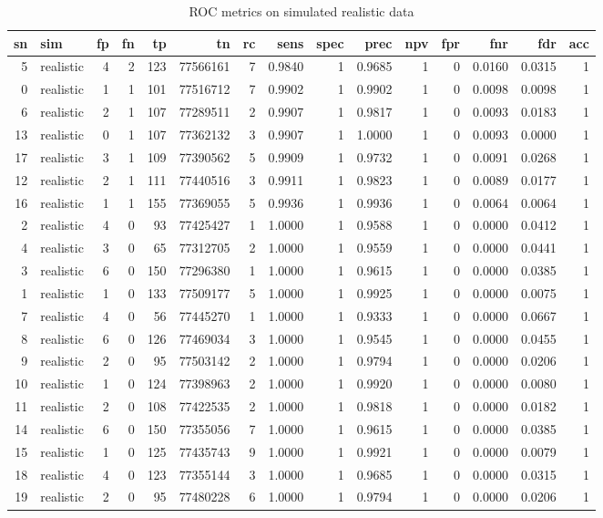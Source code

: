 \begin{sidewaystable}[]
\centering
\caption{ROC metrics on simulated realistic data}
\label{tbl:roc_realistic}
\begin{tabular}{rlrrrrrrrrrrrrr}
\toprule
sn & sim & fp & fn & tp & tn & rc & sens & spec & prec & npv & fpr & fnr & fdr & acc\\
\midrule
5 & realistic & 4 & 2 & 123 & 77566161 & 7 & 0.9840 & 1 & 0.9685 & 1 & 0 & 0.0160 & 0.0315 & 1\\
0 & realistic & 1 & 1 & 101 & 77516712 & 7 & 0.9902 & 1 & 0.9902 & 1 & 0 & 0.0098 & 0.0098 & 1\\
6 & realistic & 2 & 1 & 107 & 77289511 & 2 & 0.9907 & 1 & 0.9817 & 1 & 0 & 0.0093 & 0.0183 & 1\\
13 & realistic & 0 & 1 & 107 & 77362132 & 3 & 0.9907 & 1 & 1.0000 & 1 & 0 & 0.0093 & 0.0000 & 1\\
17 & realistic & 3 & 1 & 109 & 77390562 & 5 & 0.9909 & 1 & 0.9732 & 1 & 0 & 0.0091 & 0.0268 & 1\\
12 & realistic & 2 & 1 & 111 & 77440516 & 3 & 0.9911 & 1 & 0.9823 & 1 & 0 & 0.0089 & 0.0177 & 1\\
16 & realistic & 1 & 1 & 155 & 77369055 & 5 & 0.9936 & 1 & 0.9936 & 1 & 0 & 0.0064 & 0.0064 & 1\\
2 & realistic & 4 & 0 & 93 & 77425427 & 1 & 1.0000 & 1 & 0.9588 & 1 & 0 & 0.0000 & 0.0412 & 1\\
4 & realistic & 3 & 0 & 65 & 77312705 & 2 & 1.0000 & 1 & 0.9559 & 1 & 0 & 0.0000 & 0.0441 & 1\\
3 & realistic & 6 & 0 & 150 & 77296380 & 1 & 1.0000 & 1 & 0.9615 & 1 & 0 & 0.0000 & 0.0385 & 1\\
1 & realistic & 1 & 0 & 133 & 77509177 & 5 & 1.0000 & 1 & 0.9925 & 1 & 0 & 0.0000 & 0.0075 & 1\\
7 & realistic & 4 & 0 & 56 & 77445270 & 1 & 1.0000 & 1 & 0.9333 & 1 & 0 & 0.0000 & 0.0667 & 1\\
8 & realistic & 6 & 0 & 126 & 77469034 & 3 & 1.0000 & 1 & 0.9545 & 1 & 0 & 0.0000 & 0.0455 & 1\\
9 & realistic & 2 & 0 & 95 & 77503142 & 2 & 1.0000 & 1 & 0.9794 & 1 & 0 & 0.0000 & 0.0206 & 1\\
10 & realistic & 1 & 0 & 124 & 77398963 & 2 & 1.0000 & 1 & 0.9920 & 1 & 0 & 0.0000 & 0.0080 & 1\\
11 & realistic & 2 & 0 & 108 & 77422535 & 2 & 1.0000 & 1 & 0.9818 & 1 & 0 & 0.0000 & 0.0182 & 1\\
14 & realistic & 6 & 0 & 150 & 77355056 & 7 & 1.0000 & 1 & 0.9615 & 1 & 0 & 0.0000 & 0.0385 & 1\\
15 & realistic & 1 & 0 & 125 & 77435743 & 9 & 1.0000 & 1 & 0.9921 & 1 & 0 & 0.0000 & 0.0079 & 1\\
18 & realistic & 4 & 0 & 123 & 77355144 & 3 & 1.0000 & 1 & 0.9685 & 1 & 0 & 0.0000 & 0.0315 & 1\\
19 & realistic & 2 & 0 & 95 & 77480228 & 6 & 1.0000 & 1 & 0.9794 & 1 & 0 & 0.0000 & 0.0206 & 1\\
\bottomrule
\end{tabular}
\end{sidewaystable}

